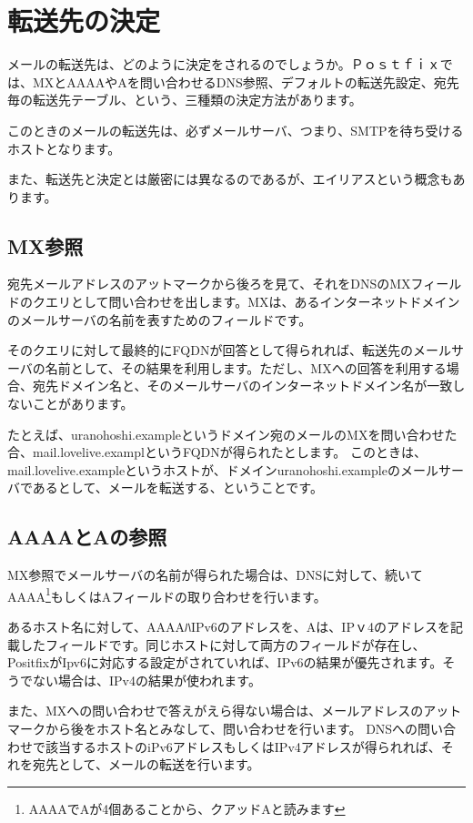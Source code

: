 \section{転送先の決定}

メールの転送先は、どのように決定をされるのでしょうか。Ｐｏｓｔｆｉｘでは、MXとAAAAやAを問い合わせるDNS参照、デフォルトの転送先設定、宛先毎の転送先テーブル、という、三種類の決定方法があります。

このときのメールの転送先は、必ずメールサーバ、つまり、SMTPを待ち受けるホストとなります。

また、転送先と決定とは厳密には異なるのであるが、エイリアスという概念もあります。

\subsection{MX参照}

宛先メールアドレスのアットマークから後ろを見て、それをDNSのMXフィールドのクエリとして問い合わせを出します。MXは、あるインターネットドメインのメールサーバの名前を表すためのフィールドです。

そのクエリに対して最終的にFQDNが回答として得られれば、転送先のメールサーバの名前として、その結果を利用します。ただし、MXへの回答を利用する場合、宛先ドメイン名と、そのメールサーバのインターネットドメイン名が一致しないことがあります。

たとえば、uranohoshi.exampleというドメイン宛のメールのMXを問い合わせた合、mail.lovelive.examplというFQDNが得られたとします。
このときは、mail.lovelive.exampleというホストが、ドメインuranohoshi.exampleのメールサーバであるとして、メールを転送する、ということです。

\subsection{AAAAとAの参照}

MX参照でメールサーバの名前が得られた場合は、DNSに対して、続いてAAAA\footnote{AAAAでAが4個あることから、クアッドAと読みます}もしくはAフィールドの取り合わせを行います。

あるホスト名に対して、AAAAﾊIPv6のアドレスを、Aは、IPｖ4のアドレスを記載したフィールドです。同じホストに対して両方のフィールドが存在し、PositfixがIpv6に対応する設定がされていれば、IPv6の結果が優先されます。そうでない場合は、IPv4の結果が使われます。

また、MXへの問い合わせで答えがえら得ない場合は、メールアドレスのアットマークから後をホスト名とみなして、問い合わせを行います。
DNSへの問い合わせで該当するホストのiPv6アドレスもしくはIPv4アドレスが得られれば、それを宛先として、メールの転送を行います。


